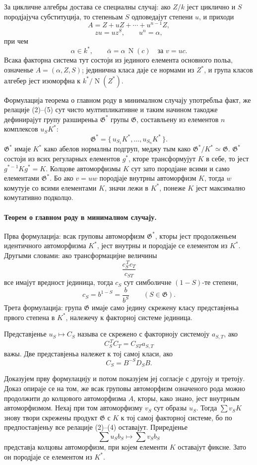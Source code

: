 ﻿\documentclass[11pt]{article}
\providecommand{\Norm}{\operatorname{N}}
\providecommand{\Gg}{\mathfrak G}
\begin{document}
За цикличне алгебры достава се специалны случај: ако \(Z/k\) јест циклично и \(S\) породјајуча субституција, то степеньам \(S\) одповедајут степени \(u\), и приходи
\[
        A=Z+uZ+\cdots+u^{n-1}Z,                              \tag{1'}
\]
\[
        zu=uz^S,\qquad u^n=\alpha,                            \tag{2'--3'}
\]
при чем
\[
        \alpha\in k^*,\qquad
        \bar\alpha=\alpha\,\Norm(c)\quad\text{за }v=uc .       \tag{4'--5'}
\]
Всака факторна система тут состоји из јединого елемента основного польа, означенье \(A=(\alpha,Z,S)\); јединична класа даје се нормами из \(Z^*\), и група класов алгебер јест изоморфна к \(k^*/\Norm(Z^*)\).

Формулација теорема о главном роду в минималном случају употребльа факт, же релације (2)--(5) сут чисто мултипликативне и таким начином такодже дефинирајут групу разширеньа \(\Gg^*\) групы \(\Gg\), составльену из елементов \(n\) комплексов \(u_S K^*\):
\[
        \Gg^*=\{\,u_{S_1}K^*,\ldots,u_{S_n}K^*\,\}.            \tag{6}
\]
\(\Gg^*\) имаје \(K^*\) како абелов нормалны подгруп, меджу тым како \(\Gg^*/K^*\simeq\Gg\). \(\Gg^*\) состоји из всих регуларных елементов \(g^*\), кторе трансформујут \(K\) в себе, то јест \(g^{*-1}Kg^*=K\). Колцове автоморфизмы \(K\) сут зато породјане всими и само елементами \(\Gg^*\). Бо ако \(v=uw\) породјаје внутрны автоморфизм \(K\), тогда \(w\) комутује со всими елементами \(K\), значи лежи в \(K^*\), понеже \(K\) јест максимално комутативно подколцо.

\paragraph{Теорем о главном роду в минималном случају.}
Прва формулација: всак груповы автоморфизм \(\Gg^*\), кторы јест продолженьем идентичного автоморфизма \(K^*\), јест внутрны и породјаје се елементом из \(K^*\). Другыми словами: ако трансформацијне величины
\[
        \frac{c_S^{\,T}c_T}{c_{ST}}
\]
все имајут вредност јединица, тогда \(c_S\) сут симболичне \((1-S)\)-те степени,
\[
        c_S=b^{1-S}=\frac{b}{b^S}\qquad(S\in\Gg).
\]
Трета формулација: група \(\Gg\) имаје само једину скрежену класу представјеньа првого степена в \(K^*\), належечу к факторној системе јединица.

Представјенье \(u_S\mapsto C_S\) называ се скрежено с факторноју системоју \(a_{S,T}\), ако
\[
        C_S^{\,T}C_T=C_{ST}a_{S,T}
\]
важы. Две представјеньа належет к тој самој класи, ако
\[
        C_S=B^{-S}D_SB .
\]

Доказујем прву формулацију и потом показујем јеј согласје с другоју и третоју. Доказ опираје се на том, же всак груповы автоморфизм означеного рода можно продолжити до колцового автоморфизма \(A\), кторы, како знано, јест внутрным автоморфизмом. Нехај при том автоморфизму \(v_S\) сут образы \(u_S\). Тогда \(\sum v_SK\) знову твори скрежены продукт \(\Gg\) с \(K\) к тој самој факторној системе, бо по предпоставјеньу все релације (2)--(4) оставајут. Приредјенье
\[
        \sum u_Sb_S\longmapsto \sum v_Sb_S
\]
представја колцовы автоморфизм, при којем елементи \(K\) оставајут фиксне. Зато он породјаје се елементом из \(K^*\).
\end{document}
